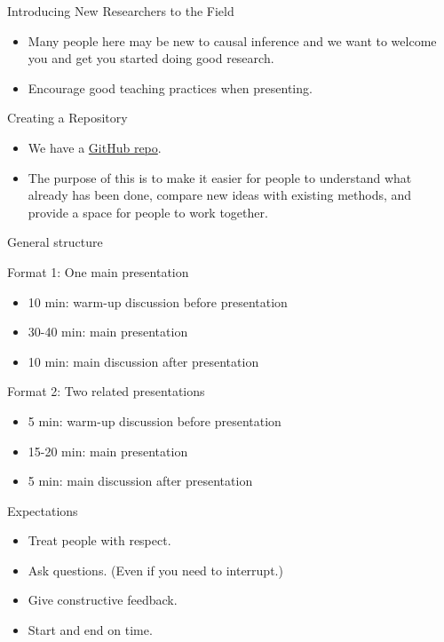 \documentclass[handout]{beamer} %
\begin{document}
\begin{frame}{Introducing New Researchers to the Field}

    \begin{itemize}
        \item Many people here may be new to causal inference and we want to welcome
        you and get you started doing good research.
        \item Encourage good teaching practices when presenting.
    \end{itemize}
    
\end{frame}

\begin{frame}{Creating a Repository}

    \begin{itemize}
        \item We have a \href{https://github.com/calebleedy/ISU-Causal}{GitHub repo}. 
        \item The purpose of this is to make it easier for people to understand
        what already has been done, compare new ideas with existing methods, and
        provide a space for people to work together.
    \end{itemize}
\end{frame}

\begin{frame}{General structure}

Format 1: One main presentation
    \begin{itemize}
        \item 10 min: warm-up discussion before presentation 
        \item 30-40 min: main presentation
        \item 10 min: main discussion after presentation
    \end{itemize}

\vspace{0.3cm}

Format 2: Two related presentations
\begin{itemize}
    \item 5 min: warm-up discussion before presentation
    \item 15-20 min: main presentation
    \item 5 min: main discussion after presentation
\end{itemize}
\end{frame}


\begin{frame}{Expectations}

    \begin{itemize}
        \item<2-> Treat people with respect.
        \item<3-> Ask questions. (Even if you need to interrupt.)
        \item<4-> Give constructive feedback.
        \item<5-> Start and end on time.
    \end{itemize}
\end{frame}
\end{document}
